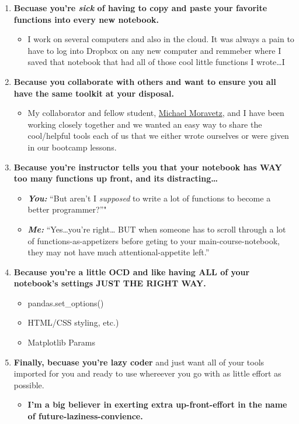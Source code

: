 \documentclass[11pt]{article}
\providecommand{\tightlist}{%
      \setlength{\itemsep}{0pt}\setlength{\parskip}{0pt}}
\begin{document}
\begin{enumerate}
\def\labelenumi{\arabic{enumi}.}
\tightlist
\item
  \textbf{Becuase you're \emph{sick} of having to copy and paste your
  favorite functions into every new notebook.}

  \begin{itemize}
  \tightlist
  \item
    I work on several computers and also in the cloud. It was always a
    pain to have to log into Dropbox on any new computer and remmeber
    where I saved that notebook that had all of those cool little
    functions I wrote\ldots{}I
  \end{itemize}
\item
  \textbf{Because you collaborate with others and want to ensure you all
  have the same toolkit at your disposal.}

  \begin{itemize}
  \tightlist
  \item
    My collaborator and fellow student,
    \href{https://github.com/MichaelMoravetz}{Michael Moravetz}, and I
    have been working closely together and we wanted an easy way to
    share the cool/helpful tools each of us that we either wrote
    ourselves or were given in our bootcamp lessons.
  \end{itemize}
\item
  \textbf{Because you're instructor tells you that your notebook has WAY
  too many functions up front, and its distracting\ldots{}}

  \begin{itemize}
  \tightlist
  \item
    \textbf{\emph{You:}} ``But aren't I \emph{supposed} to write a lot
    of functions to become a better programmer?''"
  \item
    \textbf{\emph{Me:}} ``Yes\ldots{}you're right\ldots{} BUT when
    someone has to scroll through a lot of functions-as-appetizers
    before geting to your main-course-notebook, they may not have much
    attentional-appetite left.''
  \end{itemize}
\item
  \textbf{Because you're a little OCD and like having ALL of your
  notebook's settings JUST THE RIGHT WAY.}

  \begin{itemize}
  \tightlist
  \item
    pandas.set\_options()
  \item
    HTML/CSS styling, etc.)
  \item
    Matplotlib Params
  \end{itemize}
\item
  \textbf{Finally, becuase you're lazy coder} and just want all of your
  tools imported for you and ready to use whereever you go with as
  little effort as possible.

  \begin{itemize}
  \tightlist
  \item
    \textbf{I'm a big believer in exerting extra up-front-effort in the
    name of future-laziness-convience.}
  \end{itemize}
\end{enumerate}
\end{document}
